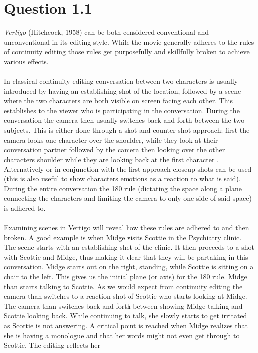 \documentclass[fleqn,14pt]{article}
\begin{document}
\section{Question 1.1}
\textit{Vertigo} (Hitchcock, 1958) can be both considered conventional and unconventional in
its editing style. While the movie generally adheres to the rules of continuity editing those rules get purposefully and
skillfully broken to achieve various effects.\\
\\
In classical continuity editing conversation between two characters is usually introduced by having an establishing shot of the location,
followed by a scene where the two characters are both visible on screen facing each other. This establishes to the viewer who is participating in the conversation\cite[p. 180]{Cor}.
During the conversation the camera then usually switches back and forth between the two subjects. This is either done through a shot and counter shot approach: first the camera looks one
character over the shoulder, while they look at their conversation partner followed by the camera then looking over the other characters shoulder while they are looking back at the first
character \cite*[p. 184]{Cor}. Alternatively or in conjunction with the first approach closeup shots can be used
(this is also useful to show characters emotions as a reaction to what is said).
During the entire conversation the 180 rule (dictating the space along a plane connecting the characters and limiting the camera to only one side of said space) is adhered to\cite*[p. 182]{Cor}.\\
\\
Examining scenes in Vertigo will reveal how these rules are adhered to and then broken. A good example is when Midge visits Scottie in the Psychiatry clinic.
The scene starts with an establishing shot of the clinic. It then proceeds to a shot with Scottie and Midge, thus making it clear that they will be partaking in this conversation.
Midge starts out on the right, standing, while Scottie is sitting on a chair to the left. This gives us the initial plane (or axis) for the 180 rule. Midge than starts talking to Scottie.
As we would expect from continuity editing the camera than switches to a reaction shot of Scottie who starts looking at Midge. The camera than switches back and forth
between showing Midge talking and Scottie looking back. While continuing to talk, she slowly starts to get irritated as Scottie is not answering. 
A critical point is reached when Midge realizes that she is having a monologue and that her words might not even get through to Scottie. The editing reflects her
\end{document}
